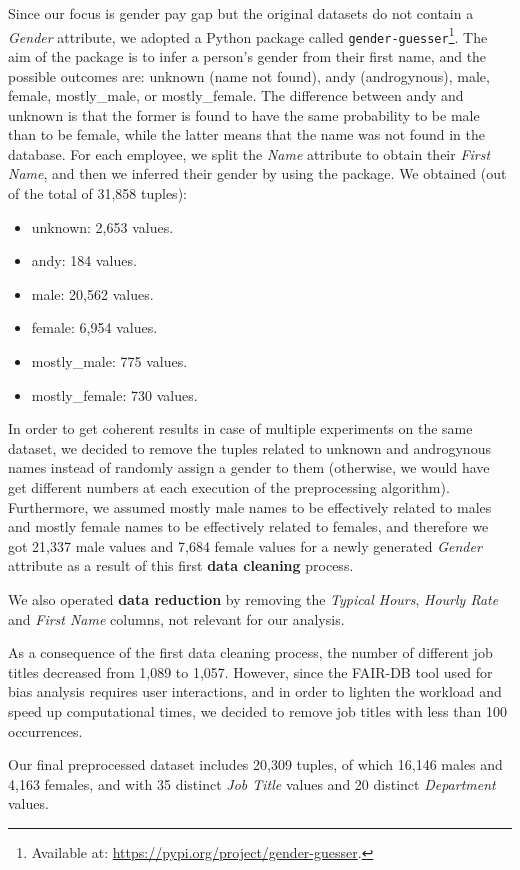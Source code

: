 Since our focus is gender pay gap but the original datasets do not contain a \textit{Gender} attribute, we adopted a Python package called \texttt{gender-guesser}\footnote{Available at: \url{https://pypi.org/project/gender-guesser}.}. The aim of the package is to infer a person's gender from their first name, and the possible outcomes are: unknown (name not found), andy (androgynous), male, female, mostly\_male, or mostly\_female. The difference between andy and unknown is that the former is found to have the same probability to be male than to be female, while the latter means that the name was not found in the database. For each employee, we split the \textit{Name} attribute to obtain their \textit{First Name}, and then we inferred their gender by using the package. We obtained (out of the total of 31,858 tuples):
\begin{itemize}
\item unknown: 2,653 values.
\item andy: 184 values.
\item male: 20,562 values.
\item female: 6,954 values.
\item mostly\_male: 775 values.
\item mostly\_female: 730 values.
\end{itemize}
In order to get coherent results in case of multiple experiments on the same dataset, we decided to remove the tuples related to unknown and androgynous names instead of randomly assign a gender to them (otherwise, we would have get different numbers at each execution of the preprocessing algorithm). Furthermore, we assumed mostly male names to be effectively related to males and mostly female names to be effectively related to females, and therefore we got 21,337 male values and 7,684 female values for a newly generated \textit{Gender} attribute as a result of this first \textbf{data cleaning} process.

We also operated \textbf{data reduction} by removing the \textit{Typical Hours}, \textit{Hourly Rate} and \textit{First Name} columns, not relevant for our analysis.

As a consequence of the first data cleaning process, the number of different job titles decreased from 1,089 to 1,057. However, since the FAIR-DB tool used for bias analysis requires user interactions, and in order to lighten the workload and speed up computational times, we decided to remove job titles with less than 100 occurrences.

Our final preprocessed dataset includes 20,309 tuples, of which 16,146 males and 4,163 females, and with 35 distinct \textit{Job Title} values and 20 distinct \textit{Department} values.


